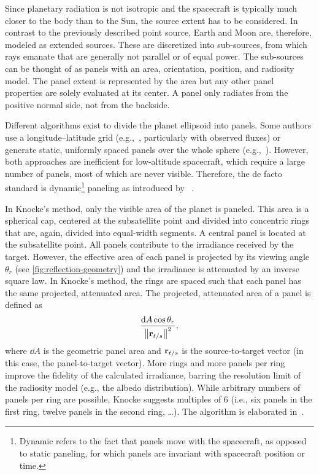 Since planetary radiation is not isotropic and the spacecraft is typically much closer to the body than to the Sun, the source extent has to be considered. In contrast to the previously described point source, Earth and Moon are, therefore, modeled as extended sources. These are discretized into sub-sources, from which rays emanate that are generally not parallel or of equal power. The sub-sources can be thought of as panels with an area, orientation, position, and radiosity model. The panel extent is represented by the area but any other panel properties are solely evaluated at its center. A panel only radiates from the positive normal side, not from the backside.

Different algorithms exist to divide the planet ellipsoid into panels. Some authors use a longitude--latitude grid (e.g.,~\cite{RodriguezSolano2011a,Woeske2019}, particularly with observed fluxes) or generate static, uniformly spaced panels over the whole sphere (e.g.,~\cite{Wetterer2014}). However, both approaches are inefficient for low-altitude spacecraft, which require a large number of panels, most of which are never visible. Therefore, the de facto standard is dynamic\footnote{Dynamic refers to the fact that panels move with the spacecraft, as opposed to static paneling, for which panels are invariant with spacecraft position or time.} paneling as introduced by \citeauthor{Knocke1988}~\cite{Knocke1988}.

In Knocke's method, only the visible area of the planet is paneled. This area is a spherical cap, centered at the subsatellite point and divided into concentric rings that are, again, divided into equal-width segments. A central panel is located at the subsatellite point. All panels contribute to the irradiance received by the target. However, the effective area of each panel is projected by its viewing angle $\theta_r$ (see \cref{fig:reflection-geometry}) and the irradiance is attenuated by an inverse square law. In Knocke's method, the rings are spaced such that each panel has the same projected, attenuated area. The projected, attenuated area of a panel is defined as~\cite{Knocke1988}
\begin{align}
    \frac{\dd{A} \cos \theta_r}{\norm{\vb r_{t/s}}^2},
\end{align}
where $\dd{A}$ is the geometric panel area and $\vb r_{t/s}$ is the source-to-target vector (in this case, the panel-to-target vector). More rings and more panels per ring improve the fidelity of the calculated irradiance, barring the resolution limit of the radiosity model (e.g., the albedo distribution). While arbitrary numbers of panels per ring are possible, Knocke suggests multiples of 6 (i.e., six panels in the first ring, twelve panels in the second ring, \dots). The algorithm is elaborated in~\cite{Knocke1989}.

